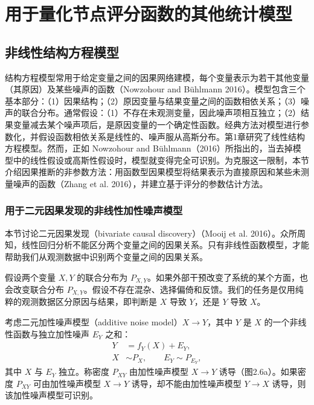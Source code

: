 \section{用于量化节点评分函数的其他统计模型}
\label{sec:ch02-other-score-models}
\subsection{非线性结构方程模型}

结构方程模型常用于给定变量之间的因果网络建模，每个变量表示为若干其他变量（其原因）及某些噪声的函数（Nowzohour and Bühlmann 2016）。模型包含三个基本部分：（1）因果结构；（2）原因变量与结果变量之间的函数相依关系；（3）噪声的联合分布。通常假设：（1）不存在未观测变量，因此噪声项相互独立；（2）结果变量减去某个噪声项后，是原因变量的一个确定性函数。经典方法对模型进行参数化，并假设函数相依关系是线性的、噪声服从高斯分布。第1章研究了线性结构方程模型。然而，正如 Nowzohour and Bühlmann（2016）所指出的，当去掉模型中的线性假设或高斯性假设时，模型就变得完全可识别。为克服这一限制，本节介绍因果推断的非参数方法：用函数型因果模型将结果表示为直接原因和某些未测量噪声的函数（Zhang et al. 2016），并建立基于评分的参数估计方法。

\subsubsection{用于二元因果发现的非线性加性噪声模型}

本节讨论二元因果发现（bivariate causal discovery）（Mooij et al. 2016）。众所周知，线性回归分析不能区分两个变量之间的因果关系。只有非线性函数模型，才能帮助我们从观测数据中识别两个变量之间的因果关系。

假设两个变量 $X,Y$ 的联合分布为 $P_{X,Y}$。如果外部干预改变了系统的某个方面，也会改变联合分布 $P_{X,Y}$。假设不存在混杂、选择偏倚和反馈。我们的任务是仅用纯粹的观测数据区分原因与结果，即判断是 $X$ 导致 $Y$，还是 $Y$ 导致 $X$。

考虑二元加性噪声模型（additive noise model）$X\to Y$，其中 $Y$ 是 $X$ 的一个非线性函数与独立加性噪声 $E_Y$ 之和：
\begin{equation}
\begin{aligned}
Y&=f_Y(X)+E_Y,\\
X&\sim P_X,\qquad E_Y\sim P_{E_Y},
\end{aligned}\tag{2.76}
\end{equation}
其中 $X$ 与 $E_Y$ 独立。称密度 $P_{XY}$ 由加性噪声模型 $X\to Y$ 诱导（图2.6a）。如果密度 $P_{XY}$ 可由加性噪声模型 $X\to Y$ 诱导，却不能由加性噪声模型 $Y\to X$ 诱导，则该加性噪声模型可识别。

